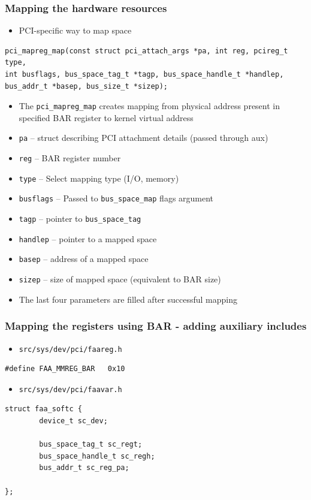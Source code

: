 \documentclass[dvipsnames,table]{beamer}
\begin{document}
\begin{frame}[fragile]
\frametitle{Mapping the hardware resources}

\begin{itemize}
	\item PCI-specific way to map space
\end{itemize}
\scriptsize
\begin{verbatim}
pci_mapreg_map(const struct pci_attach_args *pa, int reg, pcireg_t type, 
int busflags, bus_space_tag_t *tagp, bus_space_handle_t *handlep, 
bus_addr_t *basep, bus_size_t *sizep);
\end{verbatim}
\normalsize
\begin{itemize}
	\item The {\tt pci\_mapreg\_map} creates mapping from physical address present in specified BAR register to kernel virtual address
    \item {\tt pa} -- struct describing PCI attachment details (passed through aux)
    \item {\tt reg} -- BAR register number
   	\item {\tt type} -- Select mapping type (I/O, memory)
	\item {\tt busflags} -- Passed to {\tt bus\_space\_map} flags argument
	\item {\tt tagp} -- pointer to {\tt bus\_space\_tag}
	\item {\tt handlep} -- pointer to a mapped space
	\item {\tt basep} -- address of a mapped space
	\item {\tt sizep} -- size of mapped space (equivalent to BAR size)
	\item The last four parameters are filled after successful mapping
\end{itemize}
\end{frame}

\begin{frame}[fragile]
\frametitle{Mapping the registers using BAR - adding auxiliary includes}
\scriptsize
\begin{itemize}
	\item {\tt src/sys/dev/pci/faareg.h}
\end{itemize}
\begin{verbatim}
#define FAA_MMREG_BAR   0x10
\end{verbatim}
\begin{itemize}
	\item {\tt src/sys/dev/pci/faavar.h}
\end{itemize}
\begin{verbatim}
struct faa_softc {
        device_t sc_dev;

        bus_space_tag_t sc_regt;
        bus_space_handle_t sc_regh;
        bus_addr_t sc_reg_pa;

};
\end{verbatim}
\end{frame}
\end{document}
